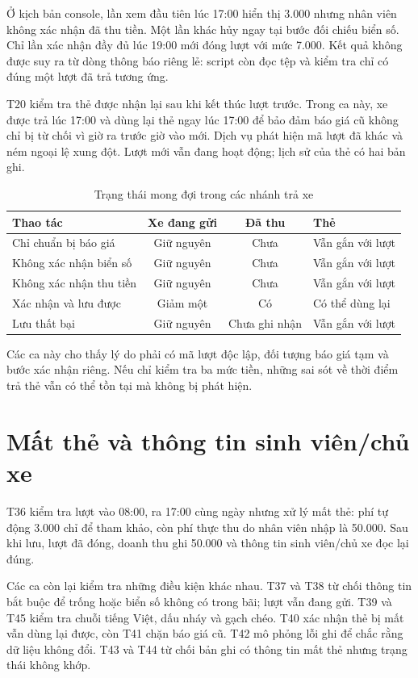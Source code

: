 Ở kịch bản console, lần xem đầu tiên lúc 17:00 hiển thị 3.000 nhưng nhân viên không xác nhận đã thu tiền. Một lần khác hủy ngay tại bước đối chiếu biển số. Chỉ lần xác nhận đầy đủ lúc 19:00 mới đóng lượt với mức 7.000. Kết quả không được suy ra từ dòng thông báo riêng lẻ: script còn đọc tệp và kiểm tra chỉ có đúng một lượt đã trả tương ứng.

T20 kiểm tra thẻ được nhận lại sau khi kết thúc lượt trước. Trong ca này, xe được trả lúc 17:00 và dùng lại thẻ ngay lúc 17:00 để bảo đảm báo giá cũ không chỉ bị từ chối vì giờ ra trước giờ vào mới. Dịch vụ phát hiện mã lượt đã khác và ném ngoại lệ xung đột. Lượt mới vẫn đang hoạt động; lịch sử của thẻ có hai bản ghi.

\begin{table}[H]
\centering\small
\caption{Trạng thái mong đợi trong các nhánh trả xe}
\label{tab:checkout-states}
\begin{tabularx}{\textwidth}{Y c c Y}
\toprule
Thao tác & Xe đang gửi & Đã thu & Thẻ\\
\midrule
Chỉ chuẩn bị báo giá & Giữ nguyên & Chưa & Vẫn gắn với lượt\\
Không xác nhận biển số & Giữ nguyên & Chưa & Vẫn gắn với lượt\\
Không xác nhận thu tiền & Giữ nguyên & Chưa & Vẫn gắn với lượt\\
Xác nhận và lưu được & Giảm một & Có & Có thể dùng lại\\
Lưu thất bại & Giữ nguyên & Chưa ghi nhận & Vẫn gắn với lượt\\
\bottomrule
\end{tabularx}
\end{table}

Các ca này cho thấy lý do phải có mã lượt độc lập, đối tượng báo giá tạm và bước xác nhận riêng. Nếu chỉ kiểm tra ba mức tiền, những sai sót về thời điểm trả thẻ vẫn có thể tồn tại mà không bị phát hiện.

\section{Mất thẻ và thông tin sinh viên/chủ xe}
T36 kiểm tra lượt vào 08:00, ra 17:00 cùng ngày nhưng xử lý mất thẻ: phí tự động 3.000 chỉ để tham khảo, còn phí thực thu do nhân viên nhập là 50.000. Sau khi lưu, lượt đã đóng, doanh thu ghi 50.000 và thông tin sinh viên/chủ xe đọc lại đúng.

Các ca còn lại kiểm tra những điều kiện khác nhau. T37 và T38 từ chối thông tin bắt buộc để trống hoặc biển số không có trong bãi; lượt vẫn đang gửi. T39 và T45 kiểm tra chuỗi tiếng Việt, dấu nháy và gạch chéo. T40 xác nhận thẻ bị mất vẫn dùng lại được, còn T41 chặn báo giá cũ. T42 mô phỏng lỗi ghi để chắc rằng dữ liệu không đổi. T43 và T44 từ chối bản ghi có thông tin mất thẻ nhưng trạng thái không khớp.

